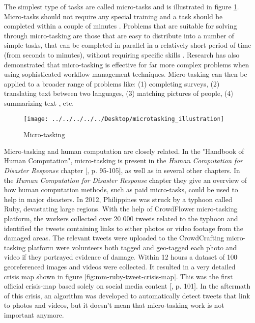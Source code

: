 The simplest type of tasks are called micro-tasks and is illustrated in figure \ref{fig:microtaskingillustration}. Micro-tasks should not require any special training and a task should be completed within a couple of minutes \citep{Ipeirotis2010}. Problems that are suitable for solving through micro-tasking are those that are easy to distribute into a number of simple tasks, that can be completed in parallel in a relatively short period of time (from seconds to minutes), without requiring specific skills \citep{Sarasua2012}. Research has also demonstrated that micro-tasking is effective for far more complex problems when using sophisticated workflow management techniques. Micro-tasking can then be applied to a broader range of problems like: (1) completing surveys, (2) translating text between two languages, (3) matching pictures of people, (4) summarizing text \citep{Bernstein2015a}, etc. 

\begin{figure}[H]
	\centering
	\texttt{[image: ../../../../../Desktop/microtasking\_illustration]}
	\caption{Micro-tasking \citep{Michelucci2015}}
	\label{fig:microtaskingillustration}
\end{figure}

Micro-tasking and human computation are closely related. In the "Handbook of Human Computation", micro-tasking is present in the \textit{Human Computation for Disaster Response} chapter [\citep{Meier2013}, p. 95-105], as well as in several other chapters. In the \textit{Human Computation for Disaster Response} chapter they give an overview of how human computation methods, such as paid micro-tasks, could be used to help in major disasters. In 2012, Philippines was struck by a typhoon called Ruby, devastating large regions. With the help of CrowdFlower micro-tasking platform, the workers collected over 20 000 tweets related to the typhoon and identified the tweets containing links to either photos or video footage from the damaged areas. The relevant tweets were uploaded to the CrowdCrafting micro-tasking platform were volunteers both tagged and geo-tagged each photo and video if they portrayed evidence of damage. Within 12 hours a dataset of 100 georeferenced images and videos were collected. It resulted in a very detailed crisis map shown in figure \ref{fig:mm-ruby-tweet-crisis-map}. This was the first official crisis-map based solely on social media content [\citep{Meier2013}, p. 101]. In the aftermath of this crisis, an algorithm was developed to automatically detect tweets that link to photos and videos, but it doesn't mean that micro-tasking work is not important anymore. 

